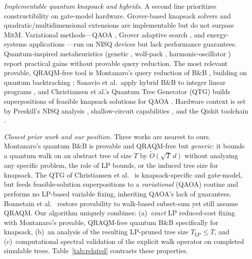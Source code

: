 \documentclass[conference]{IEEEtran}
\begin{document}
\textit{Implementable quantum knapsack and hybrids.} A second line prioritizes constructibility on gate-model hardware. Grover-based knapsack solvers \cite{ref20,ref21} and quadratic/multidimensional extensions \cite{ref22} are implementable but do not surpass MitM. Variational methods---QAOA \cite{ref25}, Grover adaptive search \cite{ref26}, and energy-systems applications \cite{ref27}---run on NISQ devices but lack performance guarantees. Quantum-inspired metaheuristics (genetic \cite{ref28}, wolf-pack \cite{ref29}, harmonic-oscillator \cite{ref30}) report practical gains without provable query reduction. The most relevant provable, QRAQM-free tool is Montanaro's query reduction of B\&B \cite{ref24}, building on quantum backtracking \cite{ref35}; Sanavio et al.\ apply hybrid B\&B to integer linear programs \cite{ref36}, and Christiansen et al.'s Quantum Tree Generator (QTG) builds superpositions of feasible knapsack solutions for QAOA \cite{ref23}. Hardware context is set by Preskill's NISQ analysis \cite{ref31}, shallow-circuit capabilities \cite{ref32}, and the Qiskit toolchain \cite{ref33}.

\textit{Closest prior work and our position.} Three works are nearest to ours. Montanaro's quantum B\&B \cite{ref24} is provable and QRAQM-free but \emph{generic}: it bounds a quantum walk on an abstract tree of size $T$ by $\tilde{O}(\sqrt{T}\,d)$ without analyzing any specific problem, the role of LP bounds, or the induced tree size for knapsack. The QTG of Christiansen et al.\ \cite{ref23} is knapsack-specific and gate-model, but feeds feasible-solution superpositions to a \emph{variational} (QAOA) routine and performs no LP-based variable fixing, inheriting QAOA's lack of guarantees. Bonnetain et al.\ \cite{bonnetain2020improved} restore provability to walk-based subset-sum yet still assume QRAQM. Our algorithm uniquely combines: (a)~\emph{exact} LP reduced-cost fixing with Montanaro's provable, QRAQM-free quantum B\&B specifically for knapsack, (b)~an analysis of the resulting LP-pruned tree size $T_{\text{LP}} \le T$, and (c)~computational spectral validation of the explicit walk operator on completed simulable trees. Table~\ref{tab:related} contrasts these properties.
\end{document}

